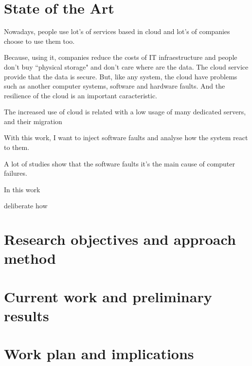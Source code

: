 \section{State of the Art}

Nowadays, people use lot's of services based in cloud and lot's of companies choose to use them too.

Because, using it, companies reduce the costs of IT infraestructure and people don't buy ``physical storage" and don't care where are the data. The cloud service provide that the data is secure.
But, like any system, the cloud have problems such as another computer systems, software and hardware faults. And the resilience of the cloud is an important caracteristic.

The increased use of cloud is related with a low usage of many dedicated servers, and their migration 



With this work, I want to inject software faults and analyse how the system react to them.

A lot of studies show that the software faults it's the main cause of computer failures.

In this work

deliberate how 

\cite{duraes2006emulation}
\cite{wolter2012resilience}
\cite{avizzienisbasic}


\newpage
\section{Research objectives and approach method}

\newpage
\section{Current work and preliminary results}

\newpage
\section{Work plan and implications}